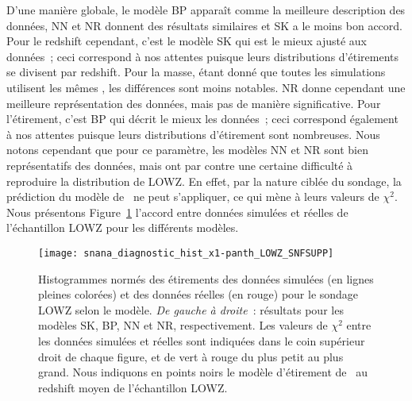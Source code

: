 \documentclass[../main/main.tex]{subfiles}
\begin{document}
D'une manière globale, le modèle BP apparaît comme la meilleure description des
données, NN et NR donnent des résultats similaires et SK a le moins bon accord.
Pour le redshift cependant, c'est le modèle SK qui est le mieux ajusté aux
données~; ceci correspond à nos attentes puisque leurs distributions
d'étirements se divisent par redshift. Pour la masse, étant donné que toutes les
simulations utilisent les mêmes \wgtmap, les différences sont moins notables. NR
donne cependant une meilleure représentation des données, mais pas de manière
significative. Pour l'étirement, c'est BP qui décrit le mieux les données~; ceci
correspond également à nos attentes puisque leurs distributions d'étirement sont
nombreuses. Nous notons cependant que pour ce paramètre, les modèles NN et NR
sont bien représentatifs des données, mais ont par contre une certaine
difficulté à reproduire la distribution de LOWZ. En effet, par la nature ciblée
du sondage, la prédiction du modèle de~ ne peut
s'appliquer, ce qui mène à leurs valeurs de $\chi^2$. Nous présentons
Figure~\ref{fig:lowz1d} l'accord entre données simulées et réelles de
l'échantillon LOWZ pour les différents modèles.

\begin{figure}[ht]
    \centering
    \texttt{[image: snana\_diagnostic\_hist\_x1-panth\_LOWZ\_SNFSUPP]}
    \caption[Histogrammes uni-dimensionnels des étirements des données simulées
    et réelles pour l'échantillon LOWZ]{Histogrammes normés des étirements des
        données simulées (en lignes pleines colorées) et des données réelles (en
        rouge) pour le sondage LOWZ selon le modèle. \textit{De gauche à
        droite}~: résultats pour les modèles SK, BP, NN et NR, respectivement.
        Les valeurs de $\chi^2$ entre les données simulées et réelles sont
        indiquées dans le coin supérieur droit de chaque figure, et de vert à
        rouge du plus petit au plus grand. Nous indiquons en points noirs le
        modèle d'étirement de~ au redshift moyen de
    l'échantillon LOWZ.}
    \label{fig:lowz1d}
\end{figure}
\end{document}
